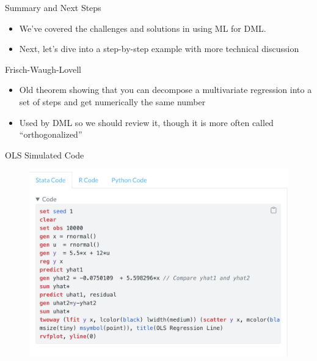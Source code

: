 \documentclass{beamer}
\begin{document}
\begin{frame}{Summary and Next Steps}
  \begin{itemize}
    \item We've covered the challenges and solutions in using ML for DML.
    \item Next, let's dive into a step-by-step example with more technical discussion
  \end{itemize}
\end{frame}

\begin{frame}{Frisch-Waugh-Lovell}

\begin{itemize}
\item Old theorem showing that you can decompose a multivariate regression into a set of steps and get numerically the same number
\item Used by DML so we should review it, though it is more often called ``orthogonalized''
\end{itemize}

\end{frame}


\begin{frame}{OLS Simulated Code}

\begin{figure}[!t]\centering
\includegraphics[scale=0.40]{./lecture_includes/ols_code}
\end{figure}

\end{frame}
\end{document}

